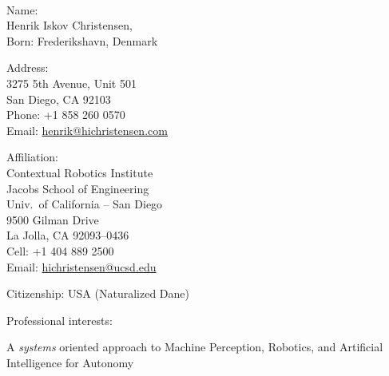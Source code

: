 \documentclass{article}
\begin{document}
\begin{cv}


  \noindent
  \begin{cvlist}{~}
  \item[Name:]\ \\
    Henrik Iskov Christensen,\\
    Born: Frederikshavn, Denmark\\
  \item[Address:]\ \\
    3275 5th Avenue, Unit 501\\
    San Diego, CA 92103\\
    Phone: +1 858 260 0570\\
    Email: \url{henrik@hichristensen.com}\\
  \item[Affiliation:]\ \\
    Contextual Robotics Institute\\
    Jacobs School of Engineering\\
    Univ.~of California -- San Diego\\
    9500 Gilman Drive\\
    La Jolla, CA 92093--0436\\
    Cell: +1 404 889 2500\\
    Email: \url{hichristensen@ucsd.edu}\\
  \item[Citizenship:] USA (Naturalized Dane)
  \end{cvlist}

  \begin{cvlist}{Professional interests:}
  \item A {\em systems} oriented approach to Machine Perception,
    Robotics, and Artificial Intelligence for Autonomy
  \end{cvlist}




\end{cv}
\end{document}
